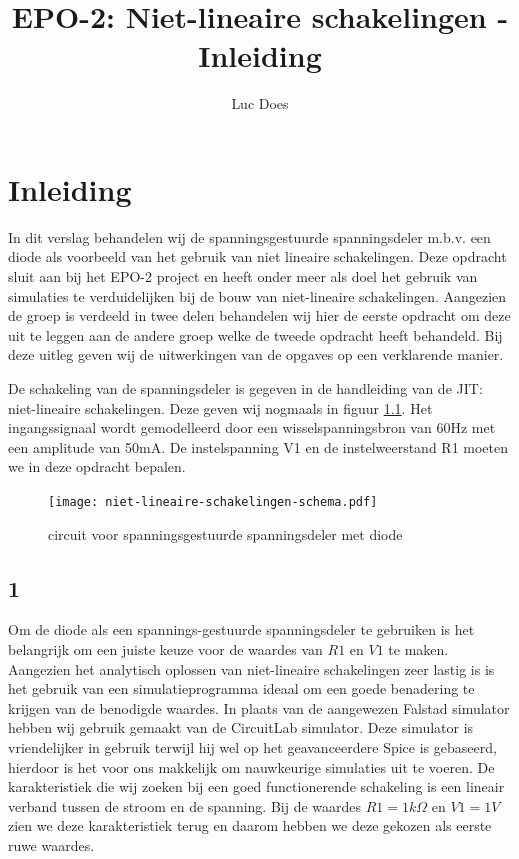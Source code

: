 \documentclass{report}
\title{EPO-2: Niet-lineaire schakelingen - Inleiding}
\author{Luc Does}
\begin{document}
\chapter{Inleiding}
\label{ch:inleiding}

In dit verslag behandelen wij de spanningsgestuurde spanningsdeler m.b.v. een diode als voorbeeld van het gebruik van niet lineaire schakelingen. Deze opdracht sluit aan bij het EPO-2 project en heeft onder meer als doel het gebruik van simulaties te verduidelijken bij de bouw van niet-lineaire schakelingen. \newline
Aangezien de groep is verdeeld in twee delen behandelen wij hier de eerste opdracht om deze uit te leggen aan de andere groep welke de tweede opdracht heeft behandeld. Bij deze uitleg geven wij de uitwerkingen van de opgaves op een verklarende manier.
\newline

\noindent De schakeling van de spanningsdeler is gegeven in de handleiding van de JIT: niet-lineaire schakelingen. Deze geven wij nogmaals in figuur \ref{fig:totaalschema}. Het ingangssignaal wordt gemodelleerd door een wisselspanningsbron van 60Hz met een amplitude van 50mA. De instelspanning V1 en de instelweerstand R1 moeten we in deze opdracht bepalen.

\begin{figure}[H]
	\centering
	\texttt{[image: niet-lineaire-schakelingen-schema.pdf]}
	\caption{circuit voor spanningsgestuurde spanningsdeler met diode}
	\label{fig:totaalschema}
\end{figure}


\section{1}
Om de diode als een spannings-gestuurde spanningsdeler te gebruiken is het belangrijk om een juiste keuze voor de waardes van $R1$ en $V1$ te maken. Aangezien het analytisch oplossen van niet-lineaire schakelingen zeer lastig is is het gebruik van een simulatieprogramma ideaal om een goede benadering te krijgen van de benodigde waardes. In plaats van de aangewezen Falstad simulator hebben wij gebruik gemaakt van de CircuitLab simulator. Deze simulator is vriendelijker in gebruik terwijl hij wel op het geavanceerdere  Spice is gebaseerd, hierdoor is het voor ons makkelijk om nauwkeurige simulaties uit te voeren.
\newline
De karakteristiek die wij zoeken bij een goed functionerende schakeling is een lineair verband tussen de stroom en de spanning. Bij de waardes $R1 = 1k\Omega$ en $V1 = 1V$ zien we deze karakteristiek terug en daarom hebben we deze gekozen als eerste ruwe waardes.
\end{document}

